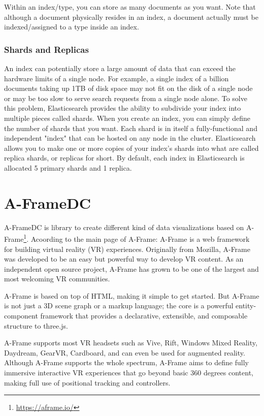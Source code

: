 \documentclass[a4paper, 12pt]{book}
\begin{document}
Within an index/type, you can store as many documents as you want. Note that although a document physically resides in an index, a document actually must be indexed/assigned to a type inside an index.

\subsubsection{Shards and Replicas}
An index can potentially store a large amount of data that can exceed the hardware limits of a single node. For example, a single index of a billion documents taking up 1TB of disk space may not fit on the disk of a single node or may be too slow to serve search requests from a single node alone. To solve this problem, Elasticsearch provides the ability to subdivide your index into multiple pieces called shards. When you create an index, you can simply define the number of shards that you want. Each shard is in itself a fully-functional and independent "index" that can be hosted on any node in the cluster.
Elasticsearch allows you to make one or more copies of your index’s shards into what are called replica shards, or replicas for short. By default, each index in Elasticsearch is allocated 5 primary shards and 1 replica.

\section{A-FrameDC}
\label{sec:aframedc}

A-FrameDC is library to create different kind of data visualizations based on A-Frame\footnote{\url{https://aframe.io/}}. Acoording to the main page of A-Frame: A-Frame is a web framework for building virtual reality (VR) experiences. Originally from Mozilla, A-Frame was developed to be an easy but powerful way to develop VR content. As an independent open source project, A-Frame has grown to be one of the largest and most welcoming VR communities.

A-Frame is based on top of HTML, making it simple to get started. But A-Frame is not just a 3D scene graph or a markup language; the core is a powerful entity-component framework that provides a declarative, extensible, and composable structure to three.js.

A-Frame supports most VR headsets such as Vive, Rift, Windows Mixed Reality, Daydream, GearVR, Cardboard, and can even be used for augmented reality. Although A-Frame supports the whole spectrum, A-Frame aims to define fully immersive interactive VR experiences that go beyond basic 360 degrees content, making full use of positional tracking and controllers.
\end{document}
